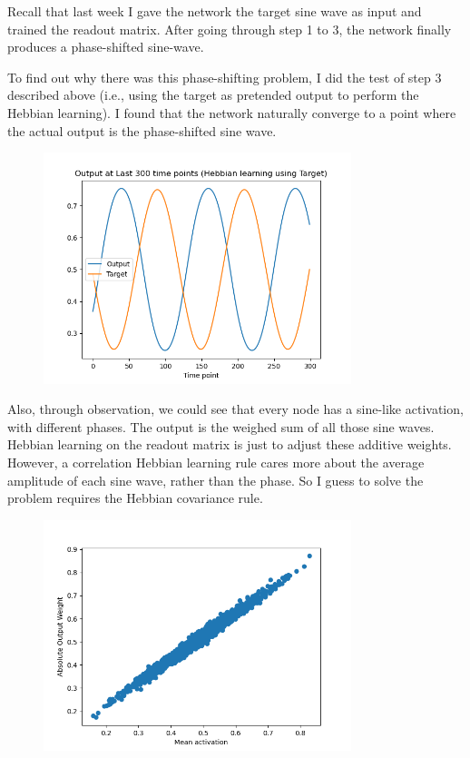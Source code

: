 \documentclass[12pt, a4paper]{article}
\begin{document}
Recall that last week I gave the network the target sine wave as input and trained the readout matrix. After going through step 1 to 3, the network finally produces a phase-shifted sine-wave. 

To find out why there was this phase-shifting problem, I did the test of step 3 described above (i.e., using the target as pretended output to perform the Hebbian learning). I found that the network naturally converge to a point where the actual output is the phase-shifted sine wave.

\begin{figure}[H]
    \centering
    \includegraphics[width=0.8\textwidth]{RNN/FORCE/fig/FORCE_targethebb_lastoutput.png} \\
\end{figure}

Also, through observation, we could see that every node has a sine-like activation, with different phases. The output is the weighed sum of all those sine waves. Hebbian learning on the readout matrix is just to adjust these additive weights. However, a correlation Hebbian learning rule cares more about the average amplitude of each sine wave, rather than the phase. So I guess to solve the problem requires the Hebbian covariance rule.

\begin{figure}[H]
    \centering
    \includegraphics[width=0.8\textwidth]{RNN/FORCE/fig/FORCE_fbtargethebb_weightcorractv.png} \\
\end{figure}
\end{document}
